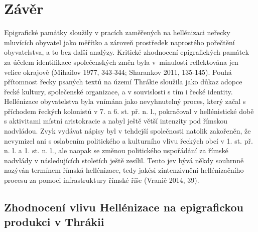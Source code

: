 \chapter{Závěr}
Epigrafické památky sloužily v pracích zaměřených na hellénizaci neřecky mluvících obyvatel jako měřítko a zároveň prostředek naprostého pořečtění obyvatelstva, a to bez další analýzy. Kritické zhodnocení epigrafických památek za účelem identifikace společenských změn byla v~minulosti reflektována jen velice okrajově (Mihailov 1977, 343-344; Sharankov 2011, 135-145). Pouhá přítomnost řecky psaných textů na území Thrákie sloužila jako důkaz adopce řecké kultury, společenské organizace, a v souvislosti s tím i řecké identity. Hellénizace obyvatelstva byla vnímána jako nevyhnutelný proces, který začal s příchodem řeckých kolonistů v 7. a 6. st. př. n. l., pokračoval v hellénistické době s aktivitami místní aristokracie a nabyl ještě větší intenzity pod římskou nadvládou. Zvyk vydávat nápisy byl v tehdejší společnosti natolik zakořeněn, že nevymizel ani s oslabením politického a kulturního vlivu řeckých obcí v 1. st. př. n. l. a 1. st. n. l., ale naopak se změnou politického uspořádání za římské nadvlády v následujících stoletích ještě zesílil. Tento jev bývá někdy souhrnně nazýván termínem římská hellénizace, tedy jakési zintenzivnění hellénizačního procesu za pomoci infrastruktury římské říše (Vranič 2014, 39).

\section[zhodnocení-vlivu-hellénizace-na-epigrafickou-produkci-v-thrákii]{Zhodnocení vlivu Hellénizace na epigrafickou produkci v Thrákii}


